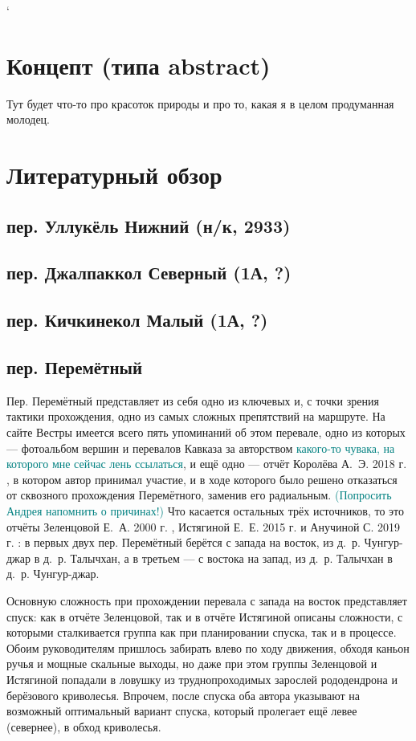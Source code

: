 \documentclass[a4paper, 12pt]{report}
\begin{document}
`
\tableofcontents









\section{Концепт (типа abstract)} 
Тут будет что-то про красоток природы и про то, какая я в целом продуманная молодец.
\section{Литературный обзор}

\subsection{пер. Уллукёль Нижний (н/к, 2933)} 
\subsection{пер. Джалпаккол Северный (1А, ?)} 
\subsection{пер. Кичкинекол Малый (1А, ?)} 
\subsection{пер. Перемётный} 
Пер. Перемётный представляет из себя одно из ключевых и, с точки зрения тактики прохождения, одно из самых сложных препятствий на маршруте. На сайте Вестры \cite{WestraCat} имеется всего пять упоминаний об этом перевале, одно из которых — фотоальбом вершин и перевалов Кавказа за авторством \textcolor{teal}{какого-то чувака, на которого мне сейчас лень ссылаться}, и ещё одно — отчёт Королёва А.~Э. 2018 г. \cite{Korolyov2018}, в котором автор принимал участие, и в ходе которого было решено отказаться от сквозного прохождения Перемётного, заменив его радиальным. \textcolor{teal}{(Попросить Андрея напомнить о причинах!)} Что касается остальных трёх источников, то это отчёты Зеленцовой Е.~А. 2000 г. \cite{Zelentsova2000}, Истягиной Е.~Е. 2015 г. и Анучиной С. 2019 г. \cite{Anuchina2019}: в первых двух пер. Перемётный берётся с запада на восток, из д.~р. Чунгур-джар в д.~р. Талычхан, а в третьем --- с востока на запад, из д.~р. Талычхан в д.~р. Чунгур-джар. 

Основную сложность при прохождении перевала с запада на восток представляет спуск: как в отчёте Зеленцовой, так и в отчёте Истягиной описаны сложности, с которыми сталкивается группа как при планировании спуска, так и в процессе. Обоим руководителям пришлось забирать влево по ходу движения, обходя каньон ручья и мощные скальные выходы, но даже при этом группы Зеленцовой и Истягиной попадали в ловушку из труднопроходимых зарослей рододендрона и берёзового криволесья. Впрочем, после спуска оба автора указывают на возможный оптимальный вариант спуска, который пролегает ещё левее (севернее), в обход криволесья. 
\end{document}
